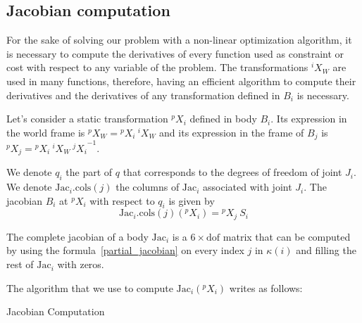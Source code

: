 \subsection{Jacobian computation}
\label{sub:jacobian_computation}


For the sake of solving our problem with a non-linear optimization algorithm, it is necessary to compute the derivatives of every function used as constraint or cost with respect to any variable of the problem.
The transformations ${}^i X_W$ are used in many functions, therefore, having an efficient algorithm to compute their derivatives and the derivatives of any transformation defined in $B_i$ is necessary.

Let's consider a static transformation ${}^p X_i$ defined in body $B_i$.
Its expression in the world frame is ${}^p X_W = {}^p X_i\ {}^i X_W$ and its expression in the frame of $B_j$ is ${}^p X_j = {}^p X_i\ {}^i X_W\ {{}^j X_i}^{-1}$.

We denote $q_i$ the part of $q$ that corresponds to the degrees of freedom of joint $J_i$.
We denote $\text{Jac}_i.\text{cols}(j)$ the columns of $\text{Jac}_i$ associated with joint $J_i$.
The jacobian $B_i$ at ${}^p X_i$ with respect to $q_i$ is given by
\begin{equation}
\label{partial_jacobian}
  \text{Jac}_i.\text{cols}(j)({}^p X_i) = {}^p X_j\ S_i
\end{equation}

The complete jacobian of a body $\text{Jac}_i$ is a $6\times \text{dof}$ matrix that can be computed by using the formula~\ref{partial_jacobian} on every index $j$ in $\kappa(i)$ and filling the rest of $\text{Jac}_i$ with zeros.

The algorithm that we use to compute $\text{Jac}_i({}{}^p X_i)$ writes as follows:

\begin{algorithm}
  \caption{Jacobian Computation}
\label{Jacobian}
\begin{algorithmic}
  \EndFor{}
\end{algorithmic}
\end{algorithm}

